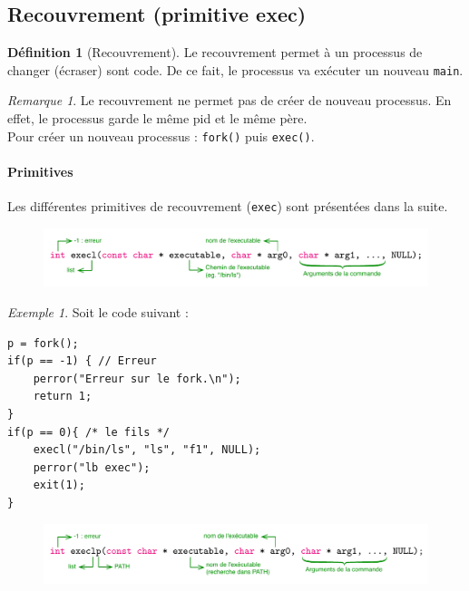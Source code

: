 \documentclass[11pt,english,french]{scrreprt}
\theoremstyle{remark}
\newtheorem*{rem*}{Remarque}
\newtheorem*{ex*}{Exemple}
\theoremstyle{definition}
\newtheorem*{def*}{Définition}
\begin{document}
\subsection{Recouvrement (primitive exec)} %

\begin{def*}[Recouvrement]
	Le recouvrement permet à un processus de changer (écraser) sont code. De ce fait, le processus va exécuter un nouveau \lstinline!main!.
\end{def*}

\begin{rem*}
	Le recouvrement ne permet pas de créer de nouveau processus. En effet, le processus garde le même pid et le même père.\\
	Pour créer un nouveau processus : \lstinline!fork()! puis \lstinline!exec()!.
\end{rem*}

\paragraph{Primitives} %

Les différentes primitives de recouvrement (\lstinline!exec!) sont présentées dans la suite.

\begin{figure}[h!]
	\center
	\vspace{-20pt}
	\includegraphics[scale=.75]{img/execl}
	\vspace{-10pt}
\end{figure}

\begin{ex*}
	Soit le code suivant :
\begin{lstlisting}
p = fork();
if(p == -1) { // Erreur
	perror("Erreur sur le fork.\n");
	return 1;
}
if(p == 0){ /* le fils */
	execl("/bin/ls", "ls", "f1", NULL);
	perror("lb exec");
	exit(1);
}
\end{lstlisting}
\end{ex*}

\begin{figure}[h!]
	\center
	\vspace{-20pt}
	\includegraphics[scale=.75]{img/execlp}
	\vspace{-10pt}
\end{figure}
\end{document}
